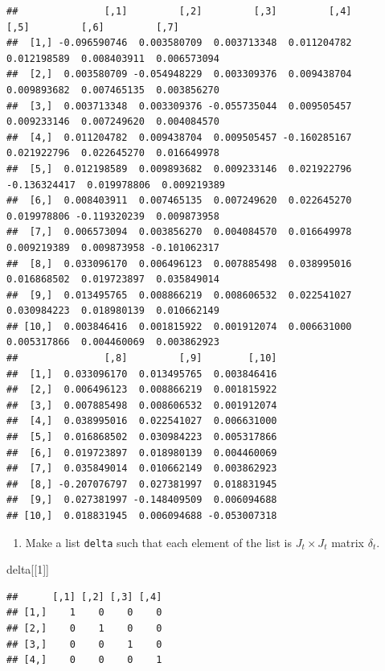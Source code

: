 \documentclass[
]{book}
\newenvironment{Shaded}{\begin{snugshade}}{\end{snugshade}}
\newcommand{\DecValTok}[1]{\textcolor[rgb]{0.00,0.00,0.81}{#1}}
\newcommand{\NormalTok}[1]{#1}
\providecommand{\tightlist}{%
  \setlength{\itemsep}{0pt}\setlength{\parskip}{0pt}}
\begin{document}
\begin{verbatim}
##               [,1]         [,2]         [,3]         [,4]         [,5]         [,6]         [,7]
##  [1,] -0.096590746  0.003580709  0.003713348  0.011204782  0.012198589  0.008403911  0.006573094
##  [2,]  0.003580709 -0.054948229  0.003309376  0.009438704  0.009893682  0.007465135  0.003856270
##  [3,]  0.003713348  0.003309376 -0.055735044  0.009505457  0.009233146  0.007249620  0.004084570
##  [4,]  0.011204782  0.009438704  0.009505457 -0.160285167  0.021922796  0.022645270  0.016649978
##  [5,]  0.012198589  0.009893682  0.009233146  0.021922796 -0.136324417  0.019978806  0.009219389
##  [6,]  0.008403911  0.007465135  0.007249620  0.022645270  0.019978806 -0.119320239  0.009873958
##  [7,]  0.006573094  0.003856270  0.004084570  0.016649978  0.009219389  0.009873958 -0.101062317
##  [8,]  0.033096170  0.006496123  0.007885498  0.038995016  0.016868502  0.019723897  0.035849014
##  [9,]  0.013495765  0.008866219  0.008606532  0.022541027  0.030984223  0.018980139  0.010662149
## [10,]  0.003846416  0.001815922  0.001912074  0.006631000  0.005317866  0.004460069  0.003862923
##               [,8]         [,9]        [,10]
##  [1,]  0.033096170  0.013495765  0.003846416
##  [2,]  0.006496123  0.008866219  0.001815922
##  [3,]  0.007885498  0.008606532  0.001912074
##  [4,]  0.038995016  0.022541027  0.006631000
##  [5,]  0.016868502  0.030984223  0.005317866
##  [6,]  0.019723897  0.018980139  0.004460069
##  [7,]  0.035849014  0.010662149  0.003862923
##  [8,] -0.207076797  0.027381997  0.018831945
##  [9,]  0.027381997 -0.148409509  0.006094688
## [10,]  0.018831945  0.006094688 -0.053007318
\end{verbatim}

\begin{enumerate}
\def\labelenumi{\arabic{enumi}.}
\setcounter{enumi}{5}
\tightlist
\item
  Make a list \texttt{delta} such that each element of the list is \(J_t \times J_t\) matrix \(\delta_t\).
\end{enumerate}

\begin{Shaded}
\begin{Highlighting}[]
\NormalTok{delta[[}\DecValTok{1}\NormalTok{]]}
\end{Highlighting}
\end{Shaded}

\begin{verbatim}
##      [,1] [,2] [,3] [,4]
## [1,]    1    0    0    0
## [2,]    0    1    0    0
## [3,]    0    0    1    0
## [4,]    0    0    0    1
\end{verbatim}
\end{document}
